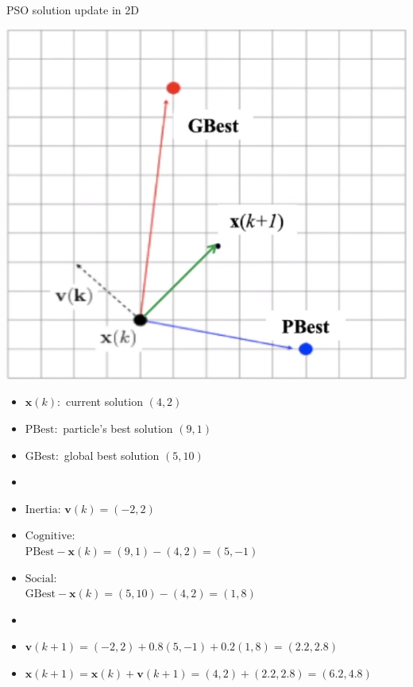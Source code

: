 \documentclass[pdflatex,compress,mathserif]{beamer}
\begin{document}
\begin{frame}{PSO solution update in 2D}
	\begin{multicols}{2}
		\includegraphics[width=\linewidth]{img/14}
		\columnbreak
		\begin{itemize}
			\item[] \scriptsize{$\mathbf{x}(k):$ current solution $(4,2)$}
			\item[] \scriptsize{$\text{PBest}:$ particle's best solution $(9,1)$}
			\item[] \scriptsize{$\text{GBest}:$ global best solution $(5,10)$}
			\item[]
			\item[] \scriptsize{$\text{Inertia}$: $\mathbf{v}(k) = (-2,2)$}
			\item[] \scriptsize{$\text{Cognitive}$:\\
				$\text{PBest} - \mathbf{x}(k) = (9,1) - (4,2) = (5,-1)$}
			\item[] \scriptsize{$\text{Social}$:\\
				$\text{GBest} - \mathbf{x}(k) = (5,10) - (4,2) = (1,8)$}
			\item[]
			\item[] $\mathbf{v}(k+1) = (-2,2) + 0.8(5,-1) + 0.2(1,8) = (2.2,2.8)$
			\item[] $\mathbf{x}(k+1) = \mathbf{x}(k) + \mathbf{v}(k+1) = (4,2) + (2.2,2.8) = (6.2, 4.8)$
		\end{itemize}
		\vfill\null
	\end{multicols}
\end{frame}
\end{document}
